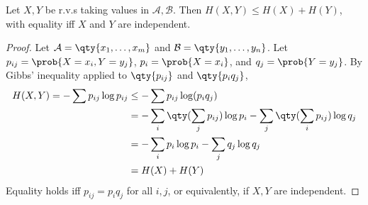 \begin{lemma}
    Let $X, Y$ be r.v.s taking values in $\mathcal A, \mathcal B$.
    Then $H(X,Y) \leq H(X) + H(Y)$, with equality iff $X$ and $Y$ are independent.
\end{lemma}

\begin{proof}
    Let $\mathcal A = \qty{x_1, \dots, x_m}$ and $\mathcal B = \qty{y_1, \dots, y_n}$.
    Let $p_{ij} = \prob{X = x_i, Y = y_j}$, $p_i = \prob{X = x_i}$, and $q_j = \prob{Y = y_j}$.
    By Gibbs' inequality applied to $\qty{p_{ij}}$ and $\qty{p_i q_j}$,
    \begin{align*}
        H(X,Y) = -\sum p_{ij} \log p_{ij} &\leq -\sum p_{ij} \log(p_i q_j) \\
        &= -\sum_i \qty(\sum_j p_{ij}) \log p_i - \sum_j \qty(\sum_i p_{ij}) \log q_j \\
        &= -\sum_i p_i \log p_i - \sum_j q_j \log q_j \\
        &= H(X) + H(Y)
    \end{align*}
    Equality holds iff $p_{ij} = p_i q_j$ for all $i, j$, or equivalently, if $X, Y$ are independent.
\end{proof}

